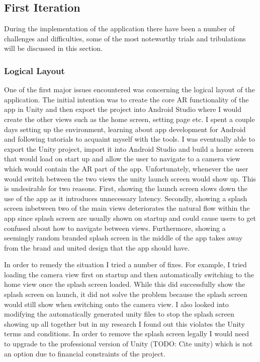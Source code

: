 \documentclass{l4proj}
\begin{document}
\subsection{First Iteration}
During the implementation of the application there have been a number of challenges and difficulties, some of the most noteworthy trials and tribulations will be discussed in this section. 

\subsubsection{Logical Layout}
One of the first major issues encountered was concerning the logical layout of the application. The initial intention was to create the core AR functionality of the app in Unity and then export the project into Android Studio where I would create the other views such as the home screen, setting page etc. I spent a couple days setting up the environment, learning about app development for Android and following tutorials to acquaint myself with the tools. I was eventually able to export the Unity project, import it into Android Studio and build a home screen that would load on start up and allow the user to navigate to a camera view which would contain the AR part of the app. Unfortunately, whenever the user would switch between the two views the unity launch screen would show up. This is undesirable for two reasons. First, showing the launch screen slows down the use of the app as it introduces unnecessary latency. Secondly, showing a splash screen inbetween two of the main views deteriorates the natural flow within the app since splash screen are usually shown on startup and could cause users to get confused about how to navigate between views. Furthermore, showing a seemingly random branded splash screen in the middle of the app takes away from the brand and united design that the app should have. 

In order to remedy the situation I tried a number of fixes. For example, I tried loading the camera view first on startup and then automatically switching to the home view once the splash screen loaded. While this did successfully show the splash screen on launch, it did not solve the problem because the splash screen would still show when switching onto the camera view. I also looked into modifying the automatically generated unity files to stop the splash screen showing up all together but in my research I found out this violates the Unity terms and conditions. In order to remove the splash screen legally I would need to upgrade to the professional version of Unity (TODO: Cite unity) which is not an option due to financial constraints of the project.
\end{document}
